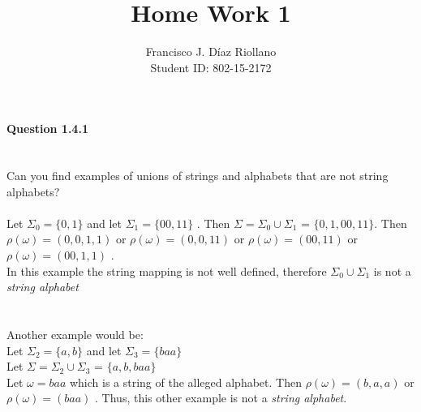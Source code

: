 \documentclass{report}
\title{Home Work 1}
\author{Francisco J. Díaz Riollano \\ Student ID: 802-15-2172 }
\newcommand{\me}[1]{
\begin{math}
#1
\end{math}
}
\begin{document}
\maketitle
\paragraph{\Large{Question 1.4.1\\ \\}}
 Can you find examples of unions of strings and alphabets that are not string alphabets?\\
 \\
 Let  \me{\Sigma_0 = \{0,1\}} and let  \me{\Sigma_1 = \{00,11\}}. Then \me{\Sigma = \Sigma _0 \cup \Sigma_1 } = \me{\{0,1,00,11\}.} Then \me{\rho(\omega) = (0,0,1,1)} or \me{\rho(\omega) = (0,0,11)} or \me{\rho(\omega) = (00,11)} or \me{\rho(\omega) = (00,1,1)}.
 \\ 
 In this example the string mapping is not well defined, therefore \me{\Sigma_0 \cup \Sigma_1} is not a \textit{string alphabet}
 \\ \\ \\
 Another example would be: \\
 Let \me{\Sigma_2 = \{a,b\}} and let \me{\Sigma_3 = \{baa\}} \\
 Let \me{\Sigma = \Sigma_2 \cup \Sigma_3} = \me{\{a,b,baa\}}\\
 Let \me{\omega = baa} which is a string of the alleged alphabet.
 Then \me{\rho(\omega) = (b,a,a)} or  \me{\rho(\omega) = (baa)}. Thus, this other example is not a \textit{string alphabet}.
 
 
 
 
\end{document}
